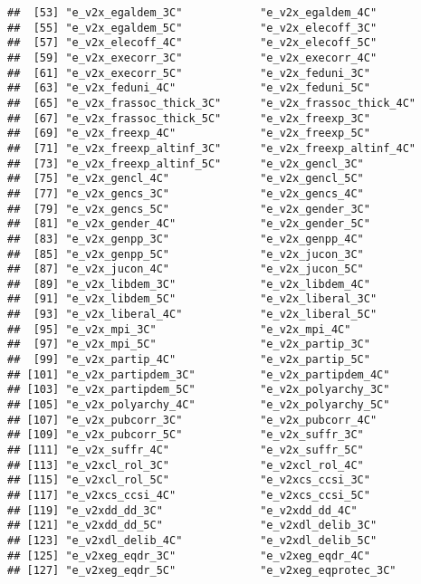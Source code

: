 \documentclass[
]{article}
\begin{document}
\begin{verbatim}
##  [53] "e_v2x_egaldem_3C"            "e_v2x_egaldem_4C"           
##  [55] "e_v2x_egaldem_5C"            "e_v2x_elecoff_3C"           
##  [57] "e_v2x_elecoff_4C"            "e_v2x_elecoff_5C"           
##  [59] "e_v2x_execorr_3C"            "e_v2x_execorr_4C"           
##  [61] "e_v2x_execorr_5C"            "e_v2x_feduni_3C"            
##  [63] "e_v2x_feduni_4C"             "e_v2x_feduni_5C"            
##  [65] "e_v2x_frassoc_thick_3C"      "e_v2x_frassoc_thick_4C"     
##  [67] "e_v2x_frassoc_thick_5C"      "e_v2x_freexp_3C"            
##  [69] "e_v2x_freexp_4C"             "e_v2x_freexp_5C"            
##  [71] "e_v2x_freexp_altinf_3C"      "e_v2x_freexp_altinf_4C"     
##  [73] "e_v2x_freexp_altinf_5C"      "e_v2x_gencl_3C"             
##  [75] "e_v2x_gencl_4C"              "e_v2x_gencl_5C"             
##  [77] "e_v2x_gencs_3C"              "e_v2x_gencs_4C"             
##  [79] "e_v2x_gencs_5C"              "e_v2x_gender_3C"            
##  [81] "e_v2x_gender_4C"             "e_v2x_gender_5C"            
##  [83] "e_v2x_genpp_3C"              "e_v2x_genpp_4C"             
##  [85] "e_v2x_genpp_5C"              "e_v2x_jucon_3C"             
##  [87] "e_v2x_jucon_4C"              "e_v2x_jucon_5C"             
##  [89] "e_v2x_libdem_3C"             "e_v2x_libdem_4C"            
##  [91] "e_v2x_libdem_5C"             "e_v2x_liberal_3C"           
##  [93] "e_v2x_liberal_4C"            "e_v2x_liberal_5C"           
##  [95] "e_v2x_mpi_3C"                "e_v2x_mpi_4C"               
##  [97] "e_v2x_mpi_5C"                "e_v2x_partip_3C"            
##  [99] "e_v2x_partip_4C"             "e_v2x_partip_5C"            
## [101] "e_v2x_partipdem_3C"          "e_v2x_partipdem_4C"         
## [103] "e_v2x_partipdem_5C"          "e_v2x_polyarchy_3C"         
## [105] "e_v2x_polyarchy_4C"          "e_v2x_polyarchy_5C"         
## [107] "e_v2x_pubcorr_3C"            "e_v2x_pubcorr_4C"           
## [109] "e_v2x_pubcorr_5C"            "e_v2x_suffr_3C"             
## [111] "e_v2x_suffr_4C"              "e_v2x_suffr_5C"             
## [113] "e_v2xcl_rol_3C"              "e_v2xcl_rol_4C"             
## [115] "e_v2xcl_rol_5C"              "e_v2xcs_ccsi_3C"            
## [117] "e_v2xcs_ccsi_4C"             "e_v2xcs_ccsi_5C"            
## [119] "e_v2xdd_dd_3C"               "e_v2xdd_dd_4C"              
## [121] "e_v2xdd_dd_5C"               "e_v2xdl_delib_3C"           
## [123] "e_v2xdl_delib_4C"            "e_v2xdl_delib_5C"           
## [125] "e_v2xeg_eqdr_3C"             "e_v2xeg_eqdr_4C"            
## [127] "e_v2xeg_eqdr_5C"             "e_v2xeg_eqprotec_3C"        

\end{verbatim}
\end{document}
